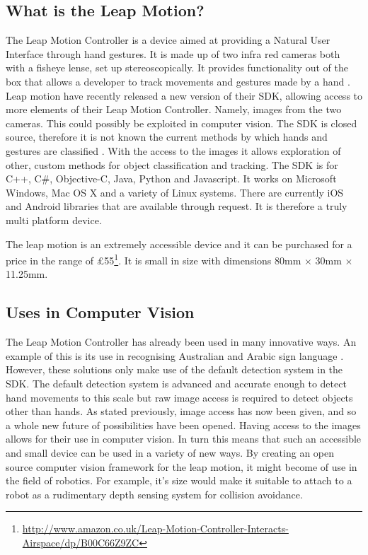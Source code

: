 \documentclass[11pt,oneside]{report}
\begin{document}
			\subsection{What is the Leap Motion?}
				The Leap Motion Controller is a device aimed at providing a Natural User Interface through hand gestures.
				It is made up of two infra red cameras both with a fisheye lense, set up stereoscopically. %
				It provides functionality out of the box that allows a developer to track movements and gestures made by a hand \cite{web:leapGestures}.
				Leap motion have recently released a new version of their SDK, allowing access to more elements of their Leap Motion Controller. 
				Namely, images from the two cameras. 
				This could possibly be exploited in computer vision. %
				The  SDK is closed source, therefore it is not known the current methods by which hands and gestures are classified \cite[p. 217]{journal:leapEvaluation}.
				With the access to the images it allows exploration of other, custom methods for object classification and tracking.
				The SDK is for C++, C\#, Objective-C, Java, Python and Javascript.
				It works on Microsoft Windows, Mac OS X and a variety of Linux systems.
				There are currently iOS and Android libraries that are available through request.
				It is therefore a truly multi platform device.
				
				The leap motion is an extremely accessible device and it can be purchased for a price in the range of \pounds55\footnote{\url{http://www.amazon.co.uk/Leap-Motion-Controller-Interacts-Airspace/dp/B00C66Z9ZC}}.
				It is small in size with dimensions 80mm $\times$ 30mm $\times$ 11.25mm.
				
				
				

			\subsection{Uses in Computer Vision}
				The Leap Motion Controller has already been used in many innovative ways.
				An example of this is its use in recognising Australian and Arabic sign language \cite{journal:leapSignLanguage,journal:leapSignLanguage2}.
				However, these solutions only make use of the default detection system in the SDK.
				The default detection system is advanced and accurate enough to detect hand movements to this scale but raw image access is required to detect objects other than hands.
				As stated previously, image access has now been given, and so a whole new future of possibilities have been opened.
				Having access to the images allows for their use in computer vision.
				In turn this means that such an accessible and small device can be used in a variety of new ways.
				By creating an open source computer vision framework for the leap motion, it might become of use in the field of robotics.
				For example, it's size would make it suitable to attach to a robot as a rudimentary depth sensing system for collision avoidance.
				
\end{document}
